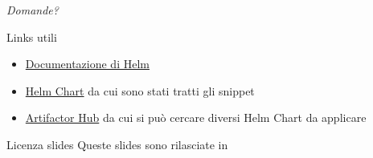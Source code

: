 \documentclass{beamer}
\begin{document}
\begin{frame}{}
\centering \Large \emph{Domande?}
\end{frame}
\begin{frame}{Links utili}
\begin{itemize}
    \item \href{https://helm.sh/docs/}{Documentazione di Helm}
    \item \href{https://github.com/bitnami/charts/tree/main/bitnami/wordpress}{Helm Chart} da cui sono stati tratti gli snippet
    \item \href{https://artifacthub.io/}{Artifactor Hub} da cui si può cercare diversi Helm Chart da applicare
\end{itemize}
\end{frame}
\begin{frame}{Licenza slides}
\centering
Queste slides sono rilasciate in 
\end{frame}
\end{document}
